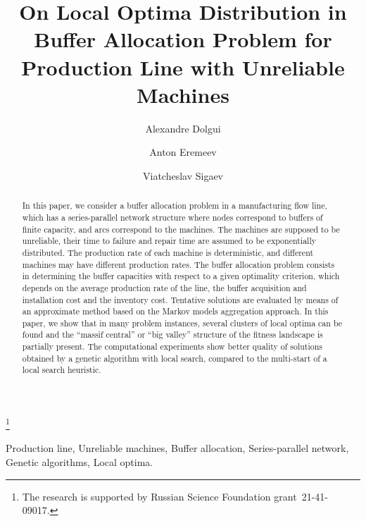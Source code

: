 \documentclass{ifacconf}
\begin{document}
\begin{frontmatter}

\title{On Local Optima Distribution in Buffer Allocation Problem for Production Line with Unreliable Machines} 

\thanks[footnoteinfo]{The research is supported by Russian Science Foundation  grant~21-41-09017.}

\author[First]{Alexandre Dolgui} 
\author[Second]{Anton Eremeev} 
\author[Third]{Viatcheslav Sigaev}

\address[First]{IMT Atlantique, Nantes, France}
\address[Second]{Sobolev Institute of Mathematics SB RAS, Novosibirsk, Russia (e-mail: eremeev@ofim.oscsbras.ru).}
\address[Third]{Avtomatika-Servis LLC, Omsk, Russia (e-mail: sigvs@yandex.ru).}


\begin{abstract}                %
In this paper, we consider a buffer allocation problem in a manufacturing flow line, which has a series-parallel 
network structure where nodes correspond to buffers  of finite capacity, and arcs correspond to the machines. 
The machines are supposed to be unreliable, their time to failure and repair time are
assumed to be exponentially distributed. The production rate of
each machine is deterministic, and different machines may have
different production rates. The buffer allocation problem consists
in determining the buffer capacities with respect to a given
optimality criterion, which depends on the average production rate
of the line, the buffer acquisition and installation cost and the
inventory cost. Tentative solutions are evaluated by means of an
approximate method based on the Markov models aggregation
approach. In this paper, we show that in many
problem instances, several clusters of local optima can be found and the ``massif central'' or ``big valley'' structure
of the fitness landscape is partially present. 
The computational experiments show better quality of
solutions obtained by a genetic algorithm with local search, compared to the multi-start 
of a local search heuristic. 
\end{abstract}

\begin{keyword}
Production line, Unreliable machines, Buffer allocation, Series-parallel network, Genetic algorithms, Local optima.
\end{keyword}

\end{frontmatter}
\end{document}
